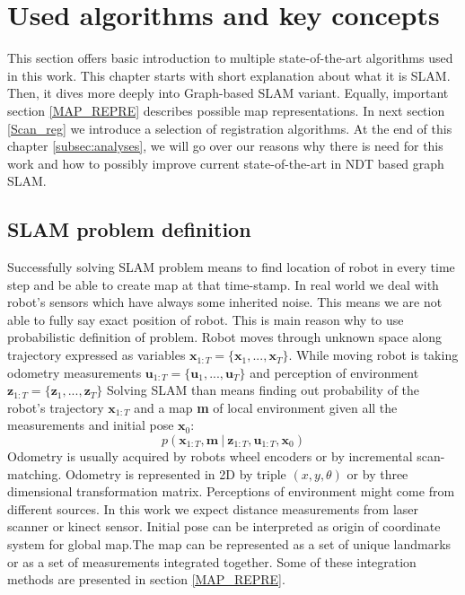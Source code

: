 \chapter{Used algorithms and key concepts}
This section offers basic introduction to multiple state-of-the-art algorithms used in this work. This chapter starts with short explanation about what it is \gls{SLAM}. Then, it dives more deeply into Graph-based SLAM variant. Equally, important section \ref{MAP_REPRE} describes possible map representations. In next section \ref{Scan_reg} we introduce a selection of registration algorithms. At the end of this chapter \ref{subsec:analyses}, we will go over our reasons why there is need for this work and how to possibly improve current state-of-the-art in NDT based graph SLAM. 

\section{SLAM problem definition}
\label{sec:SLAM_def}
Successfully solving \gls{SLAM} problem means to find location of robot in every time step and be able to create map at that time-stamp. In real world we deal with robot's sensors which have always some inherited noise. This means we are not able to fully say exact position of robot. This is main reason why to use probabilistic definition of problem. Robot moves through unknown space along trajectory expressed as variables $ \textbf{x}_{1:T} = \{\textbf{x}_{1},...,\textbf{x}_{T}\} $. While moving robot is taking odometry measurements $ \textbf{u}_{1:T} = \{\textbf{u}_{1},...,\textbf{u}_{T}\}$ and perception of environment $ \textbf{z}_{1:T} = \{\textbf{z}_{1},...,\textbf{z}_{T}\}$ Solving SLAM than means finding out probability of the robot's trajectory $ \textbf{x}_{1:T}$ and a map \textbf{m} of local environment given all the measurements and initial pose $ \textbf{x}_{0}$:
\begin{equation}
p(\textbf{x}_{1:T}, \textbf{m}\: |\:  \textbf{z}_{1:T}, \textbf{u}_{1:T}, \textbf{x}_{0})
\end{equation}
Odometry is usually acquired by robots wheel encoders or by incremental scan-matching. Odometry is represented in 2D by triple $(x,y,\theta)$ or by three dimensional transformation matrix. Perceptions of environment might come from different sources. In this work we expect distance measurements from laser scanner or kinect sensor. Initial pose can be interpreted as origin of coordinate system for global map.The map can be represented as a set of unique landmarks or as a set of measurements integrated together. Some of these integration methods are presented in section \ref{MAP_REPRE}.

